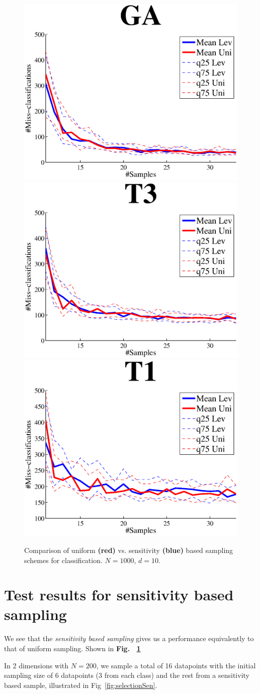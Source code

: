 \documentclass{article}
\begin{document}
\begin{figure}[!t]
\centering
\includegraphics[width=.49\linewidth]{images/GAsen.eps}
\includegraphics[width=.49\linewidth]{images/T3sen.eps}
\includegraphics[width=.49\linewidth]{images/T1sen.eps}
\caption{Comparison of uniform {\bf\color{red}(red)} vs. sensitivity {\bf\color{blue}(blue)} based sampling schemes for classification. $N = 1000$, $d = 10$.}
\label{fig:SENS_class}
\end{figure}	

\section{Test results for sensitivity based sampling}

We see that the \emph{sensitivity based sampling} gives us a performance  equivalently to that of uniform sampling. Shown in {\bf Fig.~ \ref{fig:SENS_class}}

In 2 dimensions with $N = 200$, we sample a total of 16 datapoints with the initial sampling size of 6 datapoints (3 from each class) and the rest from a sensitivity based sample, illustrated in Fig~\ref{fig:selectionSen}.
\end{document}
